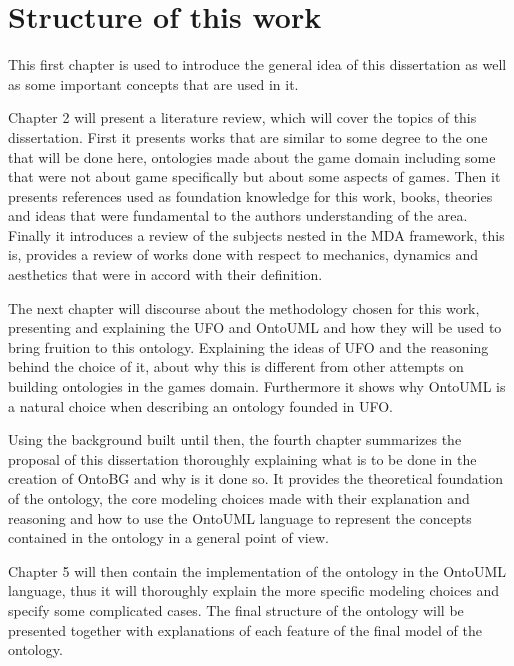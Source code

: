 \section{Structure of this work}

This first chapter is used to introduce the general idea of this dissertation as well as some important concepts that are used in it.

Chapter 2 will present a literature review, which will cover the topics of this dissertation. First it presents works that are similar to some degree to the one that will be done here, ontologies made about the game domain including some that were not about game specifically but about some aspects of games. Then it presents references used as foundation knowledge for this work, books, theories and ideas that were fundamental to the authors understanding of the area. Finally it introduces a review of the subjects nested in the MDA framework, this is, provides a review of works done with respect to mechanics, dynamics and aesthetics that were in accord with their definition.

The next chapter will discourse about the methodology chosen for this work, presenting and explaining the UFO and OntoUML and how they will be used to bring fruition to this ontology. Explaining the ideas of UFO and the reasoning behind the choice of it, about why this is different from other attempts on building ontologies in the games domain. Furthermore it shows why OntoUML is a natural choice when describing an ontology founded in UFO. 

Using the background built until then, the fourth chapter summarizes the proposal of this dissertation thoroughly explaining what is to be done in the creation of OntoBG and why is it done so. It provides the theoretical foundation of the ontology, the core modeling choices made with their explanation and reasoning and how to use the OntoUML language to represent the concepts contained in the ontology in a general point of view.

Chapter 5 will then contain the implementation of the ontology in the OntoUML language, thus it will thoroughly explain the more specific modeling choices and specify some complicated cases. The final structure of the ontology will be presented together with explanations of each feature of the final model of the ontology.

